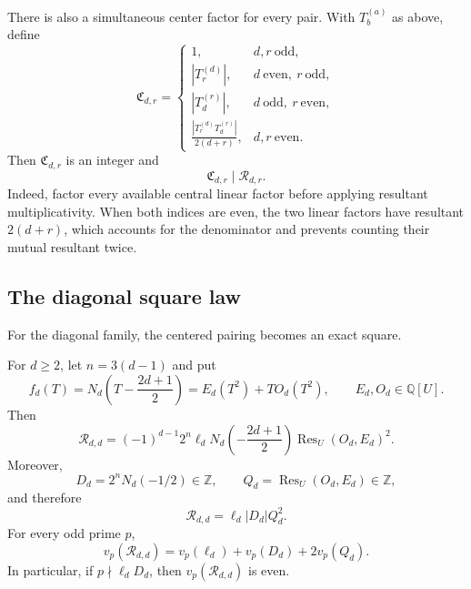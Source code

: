 There is also a simultaneous center factor for every pair.  With
$T_b^{(a)}$ as above, define
\[
 \mathfrak C_{d,r}=
 \begin{cases}
 1,&d,r\ \text{odd},\\
 |T_r^{(d)}|,&d\ \text{even},\ r\ \text{odd},\\
 |T_d^{(r)}|,&d\ \text{odd},\ r\ \text{even},\\
 \displaystyle\frac{|T_r^{(d)}T_d^{(r)}|}{2(d+r)},
     &d,r\ \text{even}.
 \end{cases}
\]
Then $\mathfrak C_{d,r}$ is an integer and
\begin{equation}\label{eq:meso-center-factor}
 \mathfrak C_{d,r}\mid\mathcal R_{d,r}.
\end{equation}
Indeed, factor every available central linear factor before applying
resultant multiplicativity.  When both indices are even, the two linear
factors have resultant $2(d+r)$, which accounts for the denominator and
prevents counting their mutual resultant twice.

\subsection{The diagonal square law}

For the diagonal family, the centered pairing becomes an exact square.

\begin{theorem}\label{thm:meso-diagonal-square}
For $d\geq2$, let $n=3(d-1)$ and put
\[
 f_d(T)=N_d\left(T-\frac{2d+1}{2}\right)
       =E_d(T^2)+TO_d(T^2),
 \qquad E_d,O_d\in\mathbb Q[U].
\]
Then
\begin{equation}\label{eq:meso-diagonal-square-rational}
 \mathcal R_{d,d}
 =(-1)^{d-1}2^n\ell_d
 N_d\left(-\frac{2d+1}{2}\right)
 \operatorname {Res}_U(O_d,E_d)^2.
\end{equation}
Moreover,
\[
 D_d=2^nN_d(-1/2)\in\mathbb Z,
 \qquad Q_d=\operatorname {Res}_U(O_d,E_d)\in\mathbb Z,
\]
and therefore
\begin{equation}\label{eq:meso-diagonal-square-integral}
 \boxed{\mathcal R_{d,d}=\ell_d|D_d|Q_d^2.}
\end{equation}
For every odd prime $p$,
\begin{equation}\label{eq:meso-diagonal-valuation}
 v_p(\mathcal R_{d,d})
 =v_p(\ell_d)+v_p(D_d)+2v_p(Q_d).
\end{equation}
In particular, if $p\nmid\ell_dD_d$, then
$v_p(\mathcal R_{d,d})$ is even.
\end{theorem}

